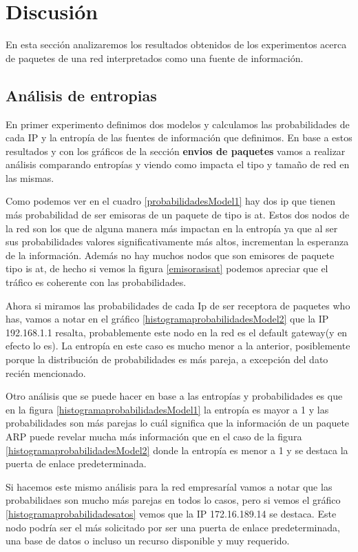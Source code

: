\section{Discusión}

En esta sección analizaremos los resultados obtenidos de los experimentos acerca de paquetes de una red interpretados como una fuente de información.

\subsection{Análisis de entropias}

En primer experimento definimos dos modelos y calculamos las probabilidades de cada IP y la entropía de las fuentes de información
que definimos. En base a estos resultados y con los gráficos de la sección \textbf{envios de paquetes} vamos a realizar análisis
comparando entropías y viendo como impacta el tipo y tamaño de red en las mismas.

Como podemos ver en el cuadro \ref{probabilidadesModel1} hay dos ip que tienen más probabilidad de ser emisoras de un paquete de tipo is at.
Estos dos nodos de la red son los que de alguna manera más impactan en la entropía ya que al ser sus probabilidades valores significativamente más 
altos, incrementan la esperanza de la información.
Además no hay muchos nodos que son emisores de paquete tipo is at, de hecho si vemos la figura \ref{emisorasisat} podemos apreciar que
el tráfico es coherente con las probabilidades.
 
Ahora si miramos las probabilidades de cada Ip de ser receptora de paquetes who has, vamos a notar en el gráfico \ref{histogramaprobabilidadesModel2}
que la IP 192.168.1.1 resalta, probablemente este nodo en la red es el default gateway(y en efecto lo es).
 La entropía en este caso es mucho menor a la anterior, posiblemente porque la distribución de probabilidades es más
pareja, a excepción del dato recién mencionado. 

Otro análisis que se puede hacer en base a las entropías y probabilidades es que en la figura \ref{histogramaprobabilidadesModel1} 
la entropía es mayor a 1 y las probabilidades son más parejas lo cuál significa que la información de un paquete ARP puede revelar 
mucha más información que en el caso de la figura \ref{histogramaprobabilidadesModel2} donde la entropía es menor a 1 y se
destaca la puerta de enlace predeterminada.

Si hacemos este mismo análisis para la red empresaríal vamos a notar que las probabilidaes son mucho más parejas en todos lo casos, pero
si vemos el gráfico \ref{histogramaprobabilidadesatos} vemos que la IP 172.16.189.14 se destaca. Este nodo podría ser el 
más solicitado por ser una puerta de enlace predeterminada, una base de datos o incluso un recurso disponible y muy requerido.

